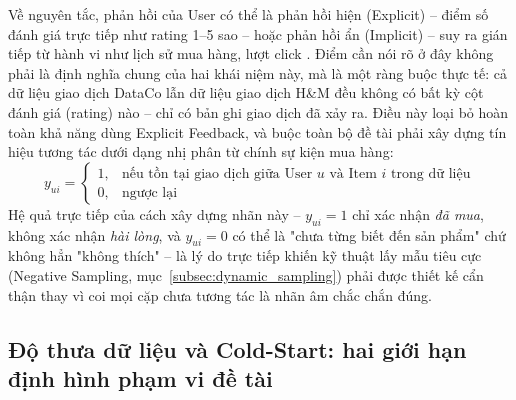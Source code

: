 Về nguyên tắc, phản hồi của User có thể là phản hồi hiện (Explicit) -- điểm số đánh giá trực tiếp như rating 1--5 sao -- hoặc phản hồi ẩn (Implicit) -- suy ra gián tiếp từ hành vi như lịch sử mua hàng, lượt click \parencite{he2017ncf, rendle2009bpr}. Điểm cần nói rõ ở đây không phải là định nghĩa chung của hai khái niệm này, mà là một ràng buộc thực tế: cả dữ liệu giao dịch DataCo lẫn dữ liệu giao dịch H\&M đều không có bất kỳ cột đánh giá (rating) nào -- chỉ có bản ghi giao dịch đã xảy ra. Điều này loại bỏ hoàn toàn khả năng dùng Explicit Feedback, và buộc toàn bộ đề tài phải xây dựng tín hiệu tương tác dưới dạng nhị phân từ chính sự kiện mua hàng:
\begin{equation}
    y_{ui} = \begin{cases}
        1, & \text{nếu tồn tại giao dịch giữa User } u \text{ và Item } i \text{ trong dữ liệu} \\
        0, & \text{ngược lại}
    \end{cases}
    \label{eq:implicit_binary}
\end{equation}
Hệ quả trực tiếp của cách xây dựng nhãn này -- $y_{ui}=1$ chỉ xác nhận \emph{đã mua}, không xác nhận \emph{hài lòng}, và $y_{ui}=0$ có thể là "chưa từng biết đến sản phẩm" chứ không hẳn "không thích" \parencite{he2017ncf} -- là lý do trực tiếp khiến kỹ thuật lấy mẫu tiêu cực (Negative Sampling, mục~\ref{subsec:dynamic_sampling}) phải được thiết kế cẩn thận thay vì coi mọi cặp chưa tương tác là nhãn âm chắc chắn đúng.

\subsection{Độ thưa dữ liệu và Cold-Start: hai giới hạn định hình phạm vi đề tài}
\label{subsec:thachthuc_sparsity}

